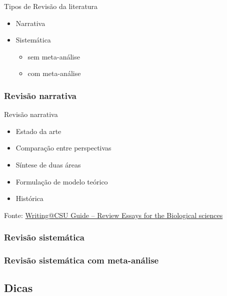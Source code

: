 \documentclass{beamer}
\begin{document}
\begin{frame}{Tipos de Revisão da literatura}
  \begin{itemize}
    \footnotesize
  \item Narrativa
    \bigskip
  \item Sistemática
    \begin{itemize}
      \scriptsize
      \medskip
    \item sem meta-análise
      \smallskip
    \item com meta-análise
    \end{itemize}
  \end{itemize}
\end{frame}

\subsubsection[Narrativa]{Revisão narrativa}

\begin{frame}{Revisão narrativa}
  \begin{itemize}
    \scriptsize
  \item Estado da arte
    \bigskip
  \item Comparação entre perspectivas
    \bigskip
  \item Síntese de duas áreas
    \bigskip
  \item Formulação de modelo teórico
    \bigskip
  \item Histórica
  \end{itemize}

  \vfill
  \scriptsize
  \hfill Fonte: \href{https://writing.colostate.edu/guides/guide.cfm?guideid=79}
  {\tiny Writing@CSU Guide -- Review Essays for the Biological sciences}
\end{frame}

\subsubsection[Sistemática]{Revisão sistemática}

\subsubsection[Meta-análise]{Revisão sistemática com meta-análise}

\subsection{Dicas}
\end{document}
